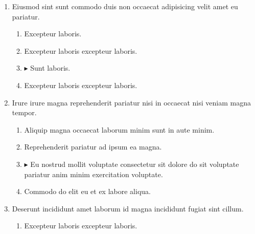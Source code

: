 \documentclass[a4paper,12pt]{article}
\begin{document}
\begin{enumerate}[label=\textbf{\arabic*.}]
\begin{multicols}{2}
\begin{enumerate}
		\item  Excepteur laboris.
    
		\item  Excepteur laboris excepteur laboris.
  
		\item $\blacktriangleright$  Sunt laboris.
    
	\end{enumerate}

\end{multicols}
\item Eiusmod sint sunt commodo duis non occaecat adipisicing velit amet eu pariatur.
\begin{multicols}{2}
	\begin{enumerate}
		\item  Excepteur laboris.
    
		\item  Excepteur laboris excepteur laboris.
  
		\item $\blacktriangleright$  Sunt laboris.
    
		\item  Excepteur laboris excepteur laboris.
    
	\end{enumerate}

\end{multicols}
\item Irure irure magna reprehenderit pariatur nisi in occaecat nisi veniam magna tempor.
\begin{multicols}{2}
	\begin{enumerate}
		\item  Aliquip magna occaecat laborum minim sunt in aute minim.
    
		\item  Reprehenderit pariatur ad ipsum ea magna.
  
		\item $\blacktriangleright$  Eu nostrud mollit voluptate consectetur sit dolore do sit voluptate pariatur anim minim exercitation voluptate.
    
		\item  Commodo do elit eu et ex labore aliqua.
    
	\end{enumerate}

\end{multicols}
\item Deserunt incididunt amet laborum id magna incididunt fugiat sint cillum.
\begin{multicols}{2}
	\begin{enumerate}
		\item  Excepteur laboris excepteur laboris.
    

\end{enumerate}
\end{multicols}
\end{enumerate}
\end{document}
